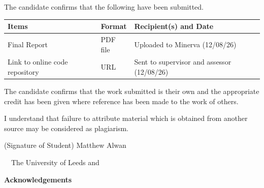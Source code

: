 \frontcover

\clearpage

\noindent The candidate confirms that the following have been submitted.\\


\begin{table}[ht!]
  \begin{tabular}{|p{}|p{}|p{}|}
    \hline
    Items                          & Format   & Recipient(s) and Date \\
    \hline
    Final Report                   & PDF file & Uploaded to Minerva (12/08/26) \\
    \hline
    Link to online code repository & URL      & Sent to supervisor and assessor (12/08/26) \\
    \hline
  \end{tabular}
\end{table}

\vfill

\noindent The candidate confirms that the work submitted is their own
and the appropriate credit has been given where reference has been
made to the work of others.

\vfill

\noindent I understand that failure to attribute material which is
obtained from another source may be considered as plagiarism.

\vfill

\flushright(Signature of Student) Matthew Alwan
\flushleft

\vfill

\textcopyright~\session~The University of Leeds and~\fullname

\begin{dissertationsummary}
  
\end{dissertationsummary}

\clearpage
\centering\textbf{Acknowledgements}
\flushleft


\tableofcontents

\clearpage

